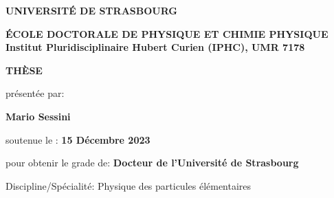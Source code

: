 \begin{titlepage}

 
    
      \begin{center}
      
      
      \vspace*{-1.2cm} %
      
      {\Large \hspace{0.6cm} \textbf{UNIVERSITÉ DE STRASBOURG}}\\
      \vspace*{1.5cm} %
      
      {\large \textbf{ÉCOLE DOCTORALE DE PHYSIQUE ET CHIMIE PHYSIQUE}}\\
      \textbf{Institut Pluridisciplinaire Hubert Curien (IPHC), UMR 7178}\\
      
      \vspace*{1.5cm} %
      
      {\LARGE \textbf{TH\`{E}SE}}
      
      présentée par:
      
      \vspace*{0.3cm}
      
      {\Large \textbf{Mario Sessini}}
      
      soutenue le : \textbf{15 Décembre 2023}
      
      
      \vspace*{0.5cm}
      
      pour obtenir le grade de: \textbf{Docteur de l'Université de Strasbourg}
      
      
      Discipline/Spécialité: Physique des particules élémentaires
      
      
      \vspace*{1cm}
      
      \fbox{
            \parbox{\textwidth}{\centering \LARGE \textbf{Recherche de violation de CP dans le couplage de Yukawa du lepton $\tau$ avec la méthode du vecteur polarimétrique dans les données du Run 2 de l'expérience CMS auprès du LHC}} %
      }
      

\end{center}
\end{titlepage}
